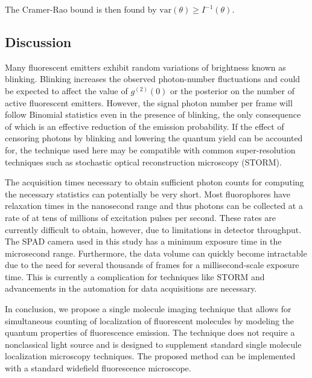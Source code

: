 \documentclass[a4paper, twocolumn, superscriptaddress,prl]{revtex4}  %
\begin{document}
The Cramer-Rao bound is then found by $\mathrm{var}(\theta) \geq I^{-1}(\theta)$. 



\subsection{Discussion}

Many fluorescent emitters exhibit random variations of brightness known as blinking. Blinking increases the observed photon-number fluctuations and could be expected to affect the value of $g^{(2)}(0)$ or the posterior on the number of active fluorescent emitters. However, the signal photon number per frame will follow Binomial statistics even in the presence of blinking, the only consequence of which is an effective reduction of the emission probability. If the effect of censoring photons by blinking and lowering the quantum yield can be accounted for, the technique used here may be compatible with common super-resolution techniques such as stochastic optical reconstruction microscopy (STORM). 

The acquisition times necessary to obtain sufficient photon counts for computing the necessary statistics can potentially be very short. Most fluorophores have relaxation times in the nanosecond range and thus photons can be collected at a rate of at tens of millions of excitation pulses per second. These rates are currently difficult to obtain, however, due to limitations in detector throughput. The SPAD camera used in this study has a minimum exposure time in the microsecond range. Furthermore, the data volume can quickly become intractable due to the need for several thousands of frames for a millisecond-scale exposure time. This is currently a complication for techniques like STORM and advancements in the automation for data acquisitions are necessary. 

In conclusion, we propose a single molecule imaging technique that allows for simultaneous counting of localization of fluorescent molecules by modeling the quantum properties of fluorescence emission. The technique does not require a nonclassical light source and is designed to supplement standard single molecule localization microscopy techniques. The proposed method can be implemented with a standard widefield fluorescence microscope.



 
\end{document}
